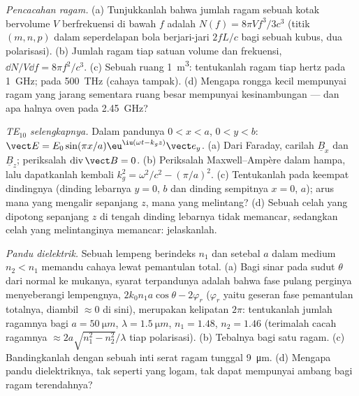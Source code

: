 \begin{exercise}[$\star\star$]\label{exo:b2:guided-waves:9}
\emph{Pencacahan ragam.} (a) Tunjukkanlah bahwa jumlah ragam sebuah kotak
bervolume $V$ berfrekuensi di bawah $f$ adalah $N(f) = 8\pi Vf^3/3c^3$ (titik
$(m, n, p)$ dalam seperdelapan bola berjari-jari $2fL/c$ bagi sebuah kubus, dua
polarisasi). (b) Jumlah ragam tiap satuan volume dan frekuensi,
$\dd N/V\dd f = 8\pi f^2/c^3$. (c) Sebuah ruang \qty{1}{m^3}: tentukanlah ragam tiap hertz pada
\qty{1}{GHz}; pada \qty{500}{THz} (cahaya tampak). (d) Mengapa rongga kecil
mempunyai ragam yang jarang sementara ruang besar mempunyai kesinambungan --- dan apa
halnya oven pada \qty{2.45}{GHz}?
\end{exercise}

\begin{exercise}[$\star\star\star$]\label{exo:b2:guided-waves:10}
\emph{TE$_{10}$ selengkapnya.} Dalam pandunya $0 < x < a$, $0 < y < b$: $\vect E =
E_0\sin(\pi x/a)\eu^{\iu(\omega t - k_gz)}\vect e_y$. (a) Dari Faraday, carilah $\underline B_x$
dan $\underline B_z$; periksalah $\operatorname{div}\vect B = 0$. (b) Periksalah Maxwell--Ampère
dalam hampa, lalu dapatkanlah kembali $k_g^2 = \omega^2/c^2 - (\pi/a)^2$. (c) Tentukanlah 
pada keempat dindingnya (dinding lebarnya $y = 0$, $b$ dan dinding sempitnya $x = 0$,
$a$); arus mana yang mengalir sepanjang $z$, mana yang melintang? (d) Sebuah celah yang dipotong sepanjang
$z$ di tengah dinding lebarnya tidak memancar, sedangkan celah yang melintanginya
memancar: jelaskanlah.
\end{exercise}

\begin{exercise}[$\star\star\star$]\label{exo:b2:guided-waves:11}
\emph{Pandu dielektrik.} Sebuah lempeng berindeks $n_1$ dan setebal $a$ dalam
medium $n_2 < n_1$ memandu cahaya lewat pemantulan total. (a) Bagi sinar pada
sudut $\theta$ dari normal ke mukanya, syarat terpandunya adalah bahwa
fase pulang perginya menyeberangi lempengnya, $2k_0n_1a\cos\theta - 2\varphi_r$ ($\varphi_r$
yaitu geseran fase pemantulan totalnya, diambil $\approx 0$ di sini), merupakan kelipatan
$2\pi$: tentukanlah jumlah ragamnya bagi $a = \qty{50}{\micro m}$, $\lambda = \qty{1.5}{\micro m}$,
$n_1 = 1.48$, $n_2 = 1.46$ (terimalah cacah ragamnya $\approx 2a\sqrt{n_1^2 - n_2^2}/\lambda$
tiap polarisasi). (b) Tebalnya bagi satu ragam. (c) Bandingkanlah dengan sebuah
inti serat ragam tunggal \qty{9}{\micro m}. (d) Mengapa pandu dielektriknya,
tak seperti yang logam, tak dapat mempunyai ambang bagi ragam terendahnya?
\end{exercise}

